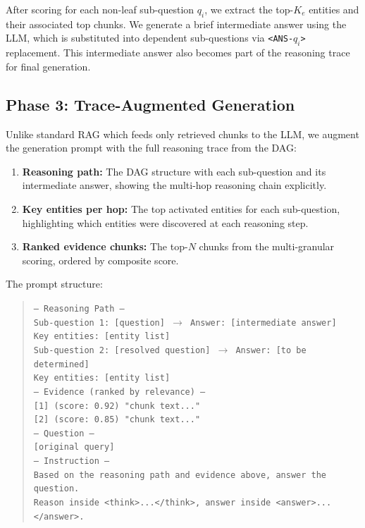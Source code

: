 \documentclass[11pt,a4paper]{article}
\begin{document}
After scoring for each non-leaf sub-question $q_i$, we extract the top-$K_e$ entities and their associated top chunks. We generate a brief intermediate answer using the LLM, which is substituted into dependent sub-questions via \texttt{<ANS-$q_i$>} replacement. This intermediate answer also becomes part of the reasoning trace for final generation.


\subsection{Phase 3: Trace-Augmented Generation}

Unlike standard RAG which feeds only retrieved chunks to the LLM, we augment the generation prompt with the full reasoning trace from the DAG:

\begin{enumerate}[leftmargin=*]
    \item \textbf{Reasoning path:} The DAG structure with each sub-question and its intermediate answer, showing the multi-hop reasoning chain explicitly.
    \item \textbf{Key entities per hop:} The top activated entities for each sub-question, highlighting which entities were discovered at each reasoning step.
    \item \textbf{Ranked evidence chunks:} The top-$N$ chunks from the multi-granular scoring, ordered by composite score.
\end{enumerate}

The prompt structure:
\begin{quote}
\texttt{--- Reasoning Path ---} \\
\texttt{Sub-question 1: [question] $\to$ Answer: [intermediate answer]} \\
\texttt{Key entities: [entity list]} \\
\texttt{Sub-question 2: [resolved question] $\to$ Answer: [to be determined]} \\
\texttt{Key entities: [entity list]} \\[6pt]
\texttt{--- Evidence (ranked by relevance) ---} \\
\texttt{[1] (score: 0.92) "chunk text..."} \\
\texttt{[2] (score: 0.85) "chunk text..."} \\[6pt]
\texttt{--- Question ---} \\
\texttt{[original query]} \\[6pt]
\texttt{--- Instruction ---} \\
\texttt{Based on the reasoning path and evidence above, answer the question.} \\
\texttt{Reason inside <think>...</think>, answer inside <answer>...</answer>.}
\end{quote}
\end{document}
